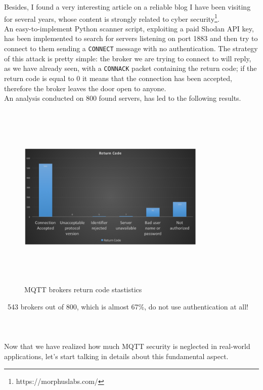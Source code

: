 \documentclass[12pt]{report}
\begin{document}
{{Besides, I found a very interesting article on a reliable blog I have been visiting for several years, whose content is strongly related to cyber security\footnote{https://morphuslabs.com/}.\\
An easy-to-implement Python scanner script, exploiting a paid Shodan API key, has been implemented to search for servers listening on port 1883 and then try to connect to them sending a \texttt{CONNECT} message with no authentication.
The strategy of this attack is pretty simple: the broker we are trying to connect to will reply, as we have already seen, with a \texttt{CONNACK} packet containing the return code; if the return code is equal to 0 it means that the connection has been accepted, therefore the broker leaves the door open to anyone.\\
An analysis conducted on 800 found servers, has led to the following results.

\begin{figure}[H]
\includegraphics[width=9cm,height=9cm,keepaspectratio]{shodan_results}
\centering
\caption{MQTT brokers return code stastistics}
\end{figure}\
543 brokers out of 800, which is almost 67\%, do not use authentication at all!
\\\\\\\\
Now that we have realized how much MQTT security is neglected in real-world applications, let's start talking in details about this fundamental aspect.

\clearpage

}}
\end{document}
